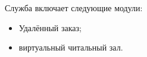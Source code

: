 Служба включает следующие модули:
\begin{itemize}
  \item Удалённый заказ; %
  \item виртуальный читальный зал.
\end{itemize}
